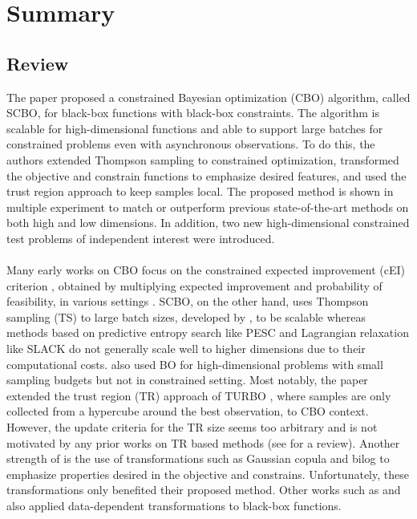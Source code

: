 

\section{Summary}
\subsection{Review}
The paper \cite{eriksson2021scalable} proposed a constrained Bayesian optimization (CBO) algorithm, called SCBO, for black-box functions with black-box constraints. The algorithm is scalable for high-dimensional functions and able to support large batches for constrained problems even with asynchronous observations. To do this, the authors extended Thompson sampling to constrained optimization, transformed the objective and constrain functions to emphasize desired features, and used the trust region approach to keep samples local. The proposed method is shown in multiple experiment to match or outperform previous state-of-the-art methods on both high and low dimensions. In addition, two new high-dimensional constrained test problems of independent interest were introduced.\\
\\
Many early works on CBO focus on the constrained expected improvement (cEI) criterion \cite{schonlau1998global}, obtained by multiplying expected improvement and probability of feasibility, in various settings \cite{sobester2014engineering,parr2012infill}. SCBO, on the other hand, uses Thompson sampling (TS) \cite{thompson1933likelihood} to large batch sizes, developed by \cite{hernandez2017parallel}, to be scalable whereas methods based on predictive entropy search like PESC \cite{hern2016general} and Lagrangian relaxation like SLACK \cite{picheny2016bayesian} do not generally scale well to higher dimensions due to their computational costs. \cite{wang2016bayesian,eriksson2018scaling,rolland2018high} also used BO for high-dimensional problems with small sampling budgets but not in constrained setting. Most notably, the paper extended the trust region (TR) approach of TURBO \cite{eriksson2019scalable}, where samples are only collected from a hypercube around the best observation, to CBO context. However, the update criteria for the TR size seems too arbitrary and is not motivated by any prior works on TR based methods (see \cite{yuan2015recent} for a review). Another strength of \cite{eriksson2021scalable} is the use of transformations such as Gaussian copula \cite{wilson2010copula} and bilog to emphasize properties desired in the objective and constrains. Unfortunately, these transformations only benefited their proposed method. Other works such as \cite{snelson2003warped} and \cite{snoek2014input} also applied data-dependent transformations to black-box functions.\\
